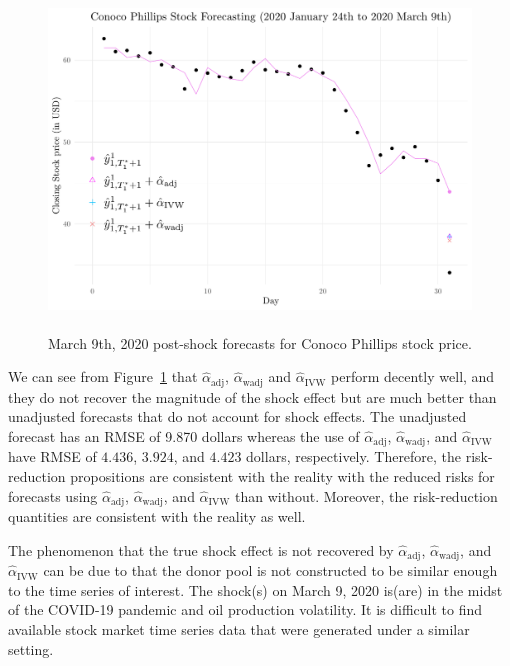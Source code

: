 \documentclass[11pt]{article}
\theoremstyle{definition}
\begin{document}
\begin{figure}
  \begin{center}
    \includegraphics[height = 9cm]{fig2.pdf}
    \caption{March 9th, 2020 post-shock forecasts for Conoco Phillips stock price.}
    \label{Fig:CP}
  \end{center}  
  \vspace{-.6cm}
\end{figure}


We can see from Figure~\ref{Fig:CP} that $\hat{\alpha}_{\text{adj}}$, $\hat{\alpha}_{\text{wadj}}$ and $\hat{\alpha}_{\text{IVW}}$ perform decently well, and they do not recover the magnitude of the shock effect but are much better than unadjusted forecasts that do not account for shock effects. 
The unadjusted forecast has an RMSE of 9.870 dollars whereas 
the use of $\hat{\alpha}_{\text{adj}}$, $\hat{\alpha}_{\text{wadj}}$, and $\hat{\alpha}_{\text{IVW}}$ have  RMSE of $4.436$, $3.924$, and $4.423$ dollars, respectively. 
Therefore, the risk-reduction propositions are consistent with the reality  with the reduced risks for forecasts using  $\hat{\alpha}_{\text{adj}}$, $\hat{\alpha}_{\text{wadj}}$, and $\hat{\alpha}_{\text{IVW}}$ than without. Moreover, the risk-reduction quantities are consistent with the reality as well. 


The phenomenon that the true shock effect is not recovered by $\hat{\alpha}_{\text{adj}}$, $\hat{\alpha}_{\text{wadj}}$, and $\hat{\alpha}_{\text{IVW}}$ can be due to that the donor pool is not constructed to be similar enough to the time series of interest. The shock(s) on March 9, 2020 is(are) in the midst of the COVID-19 pandemic and oil production volatility. It is difficult to find available stock market time series data that were generated under a similar setting.  
\end{document}
